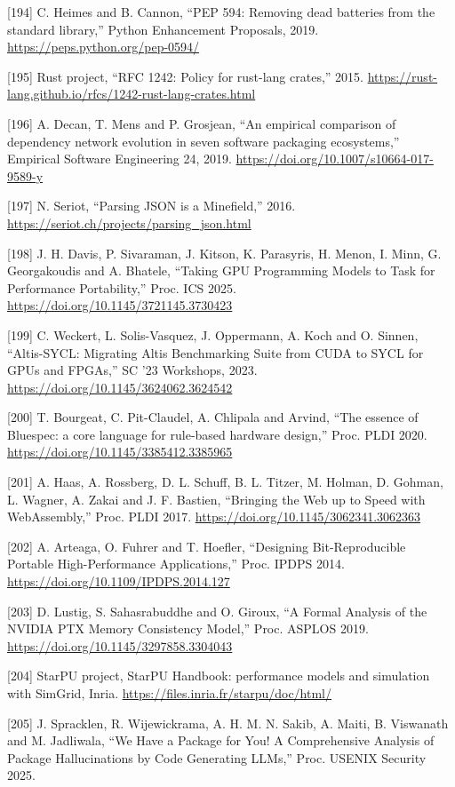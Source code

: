 \documentclass[10pt,letterpaper]{article}
\begin{document}
{[}194{]} C. Heimes and B. Cannon, ``PEP 594: Removing dead batteries
from the standard library,'' Python Enhancement Proposals, 2019.
\url{https://peps.python.org/pep-0594/}

{[}195{]} Rust project, ``RFC 1242: Policy for rust-lang crates,'' 2015.
\url{https://rust-lang.github.io/rfcs/1242-rust-lang-crates.html}

{[}196{]} A. Decan, T. Mens and P. Grosjean, ``An empirical comparison
of dependency network evolution in seven software packaging
ecosystems,'' Empirical Software Engineering 24, 2019.
\url{https://doi.org/10.1007/s10664-017-9589-y}

{[}197{]} N. Seriot, ``Parsing JSON is a Minefield,'' 2016.
\url{https://seriot.ch/projects/parsing_json.html}

{[}198{]} J. H. Davis, P. Sivaraman, J. Kitson, K. Parasyris, H. Menon,
I. Minn, G. Georgakoudis and A. Bhatele, ``Taking GPU Programming Models
to Task for Performance Portability,'' Proc. ICS 2025.
\url{https://doi.org/10.1145/3721145.3730423}

{[}199{]} C. Weckert, L. Solis-Vasquez, J. Oppermann, A. Koch and O.
Sinnen, ``Altis-SYCL: Migrating Altis Benchmarking Suite from CUDA to
SYCL for GPUs and FPGAs,'' SC '23 Workshops, 2023.
\url{https://doi.org/10.1145/3624062.3624542}

{[}200{]} T. Bourgeat, C. Pit-Claudel, A. Chlipala and Arvind, ``The
essence of Bluespec: a core language for rule-based hardware design,''
Proc. PLDI 2020. \url{https://doi.org/10.1145/3385412.3385965}

{[}201{]} A. Haas, A. Rossberg, D. L. Schuff, B. L. Titzer, M. Holman,
D. Gohman, L. Wagner, A. Zakai and J. F. Bastien, ``Bringing the Web up
to Speed with WebAssembly,'' Proc. PLDI 2017.
\url{https://doi.org/10.1145/3062341.3062363}

{[}202{]} A. Arteaga, O. Fuhrer and T. Hoefler, ``Designing
Bit-Reproducible Portable High-Performance Applications,'' Proc. IPDPS
2014. \url{https://doi.org/10.1109/IPDPS.2014.127}

{[}203{]} D. Lustig, S. Sahasrabuddhe and O. Giroux, ``A Formal Analysis
of the NVIDIA PTX Memory Consistency Model,'' Proc. ASPLOS 2019.
\url{https://doi.org/10.1145/3297858.3304043}

{[}204{]} StarPU project, StarPU Handbook: performance models and
simulation with SimGrid, Inria.
\url{https://files.inria.fr/starpu/doc/html/}

{[}205{]} J. Spracklen, R. Wijewickrama, A. H. M. N. Sakib, A. Maiti, B.
Viswanath and M. Jadliwala, ``We Have a Package for You! A Comprehensive
Analysis of Package Hallucinations by Code Generating LLMs,'' Proc.
USENIX Security 2025.
\end{document}

